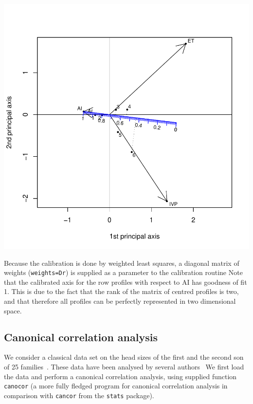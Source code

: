 \documentclass[a4paper]{article}
\begin{document}
\includegraphics{CalibrationGuide-013}

Because the calibration is done by weighted least squares, a diagonal matrix of weights ({\tt weights=Dr}) 
is supplied as a parameter to the calibration routine
Note that the calibrated axis for the row profiles with respect to AI has goodness of fit 1. This
is due to the fact that the rank of the matrix of centred profiles is two, and that therefore
all profiles can be perfectly represented in two dimensional space.

\subsection{Canonical correlation analysis}
\label{sec:cca}

We consider a classical data set on the head sizes of the first and the second son of 25 families~\cite{Frets}.
These data have been analysed by several authors~\cite{Anderson,Mardia,Graffel16}
We first load the data and perform
a canonical correlation analysis, using supplied function {\tt canocor} (a more fully 
fledged program for canonical correlation analysis in comparison with {\tt cancor} from the {\tt stats} package).
\end{document}
